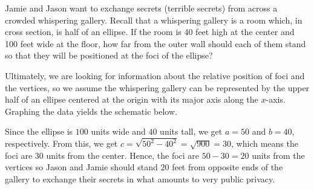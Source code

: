 \documentclass{ximera}
\begin{document}
\begin{example} \label{whisgalleryex} Jamie and Jason want to exchange secrets (terrible secrets) from across a crowded whispering gallery.  Recall that a whispering gallery is a room which, in cross section, is half of an ellipse.  If the room is 40 feet high at the center and 100 feet wide at the floor, how far from the outer wall should each of them stand so that they will be positioned at the foci of the ellipse? 

 

\begin{explanation} Ultimately, we are looking for information about the relative position of foci and the vertices, so we assume the whispering gallery can be represented by the upper half of an ellipse centered at the origin with its major axis along the $x$-axis. Graphing the data yields the schematic below.

\begin{image}

\end{image} 

Since the ellipse is $100$ units wide and $40$ units tall, we get $a=50$ and $b=40$, respectively.  From this, we get $c = \sqrt{50^2-40^2} = \sqrt{900} = 30$, which means the foci are $30$ units from the center.  Hence, the foci are $50-30=20$ units from the vertices so Jason and Jamie should stand $20$ feet from opposite ends of the gallery to exchange their secrets in what amounts to very public privacy.
\end{explanation}
\end{example}



\closegraphsfile
\end{document}
